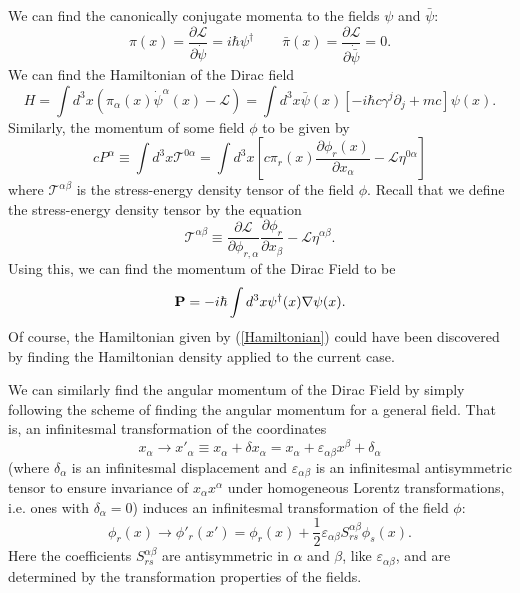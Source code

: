 We can find the canonically conjugate momenta to the fields $\psi$ and $\bar{\psi}$:
\begin{equation}
\pi(x) = \frac{\partial\mathcal{L}}{\partial\dot{\psi}} = i\hbar\psi^\dag\qquad\bar{\pi}(x) = \frac{\partial\mathcal{L}}{\partial\dot{\bar{\psi}}} = 0.
\end{equation}
We can find the Hamiltonian of the Dirac field
\begin{equation}\label{Hamiltonian}
H = \int d^{3}x( \pi_{\alpha}(x)\dot{\psi}^{\alpha}(x) - \mathcal{L} ) = \int d^{3}x \bar{\psi}(x)[-i\hbar c\gamma^{j}\partial_{j} + mc]\psi(x).
\end{equation}
Similarly, the momentum of some field $\phi$ to be given by
\begin{equation*}
cP^\alpha \equiv \int d^3x\mathcal{T}^{0\alpha} = \int d^{3}x\left[c\pi_r(x)\frac{\partial\phi_r(x)}{\partial x_{\alpha}} - \mathcal{L}\eta^{0\alpha}\right]
\end{equation*}
where $\mathcal{T}^{\alpha\beta}$ is the stress-energy density tensor of the field $\phi$. Recall that we define the stress-energy density tensor by the equation
\begin{equation}
\mathcal{T}^{\alpha\beta}\equiv \frac{\partial\mathcal{L}}{\partial\phi_{r,\alpha}}\frac{\partial\phi_r}{\partial x_\beta} - \mathcal{L}\eta^{\alpha\beta}.
\end{equation}
Using this, we can find the momentum of the Dirac Field to be
\begin{equation}
\bold{P} = -i\hbar\int d^3x\psi^\dag(x)\nabla\psi(x).
\end{equation}
Of course, the Hamiltonian given by (\ref{Hamiltonian}) could have been discovered by finding the Hamiltonian density applied to the current case.

We can similarly find the angular momentum of the Dirac Field by simply following the scheme of finding the angular momentum for a general field. That is, an infinitesmal transformation of the coordinates
\begin{equation}
x_\alpha\to x'_\alpha\equiv x_\alpha + \delta x_\alpha = x_\alpha + \varepsilon_{\alpha\beta}x^\beta + \delta_\alpha
\end{equation}
(where $\delta_\alpha$ is an infinitesmal displacement and $\varepsilon_{\alpha\beta}$ is an infinitesmal antisymmetric tensor to ensure invariance of $x_\alpha x^\alpha$ under homogeneous Lorentz transformations, i.e. ones with $\delta_\alpha=0$) induces an infinitesmal transformation of the field $\phi$:
\begin{equation}
\phi_r(x)\to\phi'_r(x') = \phi_r(x) + \frac{1}{2}\varepsilon_{\alpha\beta}S^{\alpha\beta}_{rs}\phi_{s}(x).
\end{equation}
Here the coefficients $S^{\alpha\beta}_{rs}$ are antisymmetric in $\alpha$ and $\beta$, like $\varepsilon_{\alpha\beta}$, and are determined by the transformation properties of the fields.

